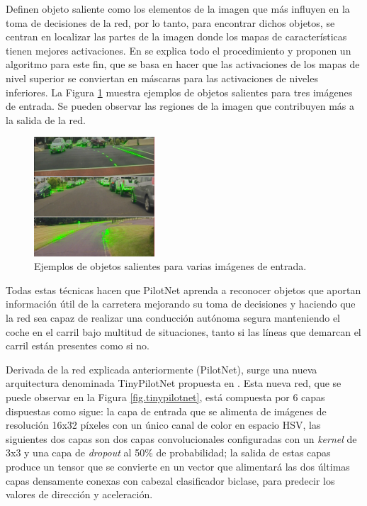 Definen objeto saliente como los elementos de la imagen que más influyen en la toma de decisiones de la red, por lo tanto, para encontrar dichos objetos, se centran en localizar las partes de la imagen donde los mapas de características tienen mejores activaciones. En \cite{explaining-end2end} se explica todo el procedimiento y proponen un algoritmo para este fin, que se basa en hacer que las activaciones de los mapas de nivel superior se conviertan en máscaras para las activaciones de niveles inferiores. La Figura \ref{fig.salient} muestra ejemplos de objetos salientes para tres imágenes de entrada. Se pueden observar las regiones de la imagen que contribuyen más a la salida de la red.

\begin{figure}
\begin{center}
	\includegraphics[width=0.4\textwidth]{img/saliencia.png}
   \caption{Ejemplos de objetos salientes para varias imágenes de entrada.}
	\label{fig.salient}
\end{center}
\end{figure}

Todas estas técnicas hacen que PilotNet aprenda a reconocer objetos que aportan información útil de la carretera mejorando su toma de decisiones y haciendo que la red sea capaz de realizar una conducción autónoma segura manteniendo el coche en el carril bajo multitud de situaciones, tanto si las líneas que demarcan el carril están presentes como si no.

Derivada de la red explicada anteriormente (PilotNet), surge una nueva arquitectura denominada TinyPilotNet propuesta en \cite{self-driving}. Esta nueva red, que se puede observar en la Figura \ref{fig.tinypilotnet}, está compuesta por 6 capas dispuestas como sigue: la capa de entrada que se alimenta de imágenes de resolución 16x32 píxeles con un único canal de color en espacio HSV, las siguientes dos capas son dos capas convolucionales configuradas con un \textit{kernel} de 3x3 y una capa de \textit{dropout} al 50\% de probabilidad; la salida de estas capas produce un tensor que se convierte en un vector que alimentará las dos últimas capas densamente conexas con cabezal clasificador biclase, para predecir los valores de dirección y aceleración.

